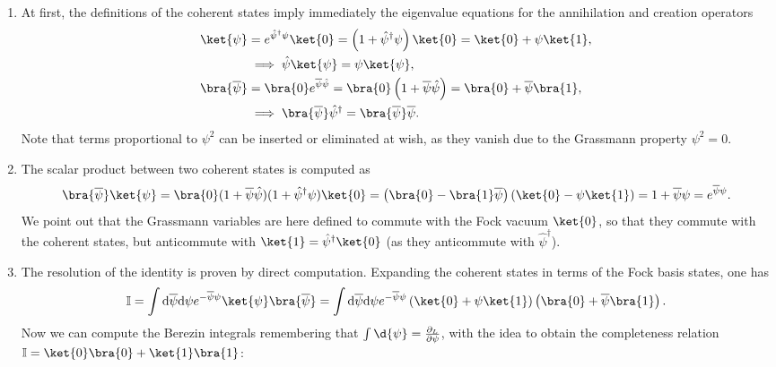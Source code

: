\begin{enumerate}[start=0]
    \item At first, the definitions of the coherent states imply immediately the eigenvalue equations for the annihilation and creation operators
          \[
              \begin{aligned}
                  \ket{\psi}            & = e^{\hat{\psi}^\dagger \psi} \ket{0} = \left( 1 + \hat{\psi}^\dagger \psi \right) \ket{0} = \ket{0} + \psi \ket{1},                  \\
                                        & \implies \hat{\psi} \ket{\psi} = \psi \ket{\psi},                                                                                     \\
                  \bra{\overline{\psi}} & = \bra{0} e^{\overline{\psi} \hat{\psi}} = \bra{0} \left( 1 + \overline{\psi} \hat{\psi} \right) = \bra{0} + \overline{\psi} \bra{1}, \\
                                        & \implies \bra{\overline{\psi}} \hat{\psi}^\dagger = \bra{\overline{\psi}} \overline{\psi}.
              \end{aligned}
          \]
          Note that terms proportional to \(\psi^2\) can be inserted or eliminated at wish, as they vanish due to the Grassmann property \(\psi^2 = 0\).
    \item The scalar product between two coherent states is computed as
          \[
              \bra{\overline{\psi}} \ket{\psi} = \bra{0} (1 + \overline{\psi} \hat{\psi}) (1 + \hat{\psi}^\dagger \psi) \ket{0} = \left(\bra{0} - \bra{1}\overline{\psi}\right)\left( \ket{0} - \psi \ket{1}\right) = 1 + \overline{\psi} \psi = e^{\overline{\psi} \psi}.
          \]
          We point out that the Grassmann variables are here defined to commute with the Fock vacuum \(\ket{0}\), so that they commute with the coherent states, but anticommute with \(\ket{1} = \hat{\psi}^\dagger \ket{0}\) (as they anticommute with \(\hat{\psi}^\dagger\)).
    \item The resolution of the identity is proven by direct computation. Expanding the coherent states in terms of the Fock basis states, one has
          \[
              \mathbb{I} = \int \mathrm{d} \overline{\psi} \mathrm{d} \psi e^{-\overline{\psi} \psi} \ket{\psi} \bra{\overline{\psi}} = \int \mathrm{d} \overline{\psi} \mathrm{d} \psi e^{-\overline{\psi} \psi} \left( \ket{0} + \psi \ket{1} \right) \left( \bra{0} + \overline{\psi} \bra{1} \right).
          \]
          Now we can compute the Berezin integrals remembering that \(\int \d{\psi} = \frac{\partial_L}{\partial \psi}\), with the idea to obtain the completeness relation \(\mathbb{I} = \ket{0}\bra{0} + \ket{1}\bra{1}\):

\end{enumerate}
